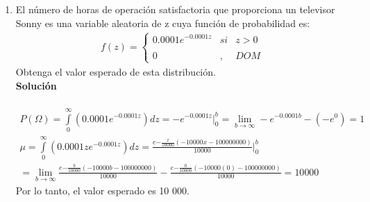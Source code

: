 \begin{enumerate}
    \item El número de horas de operación satisfactoria que proporciona un televisor Sonny es una variable aleatoria de z cuya función de probabilidad es: \\
    \begin{align*}
    f(z)= \left\{ \begin{array}{lcc}
    0.0001e^{-0.0001z} &   si  & z > 0 \\
    \\ 0 &  ,  & DOM
    \end{array}
    \right.
    \end{align*}
    Obtenga el valor esperado de esta distribución.
    \\\textbf{Solución}
    \\ \\
    \begin{gather*}
    P(\Omega) = \int \limits_{0}^{\infty} (0.0001e^{-0.0001z}) dz = -e^{-0.0001z} \bigg\vert_{0}^{b} = \lim \limits_{b \rightarrow \infty} -e^{-0.0001b} - (-e^{0}) = 1 \\
    \mu = \int \limits_{0}^{\infty} (0.0001ze^{-0.0001z}) dz = \frac{e{-\frac{x}{10 000}}(-10 000x - 100 000 000)}{10 000} \bigg\vert_{0}^b \\
    = \lim \limits_{b \rightarrow \infty} \frac{e{-\frac{b}{10 000}}(-10 000b - 100 000 000)}{10 000} - \frac{e{-\frac{0}{10 000}}(-10 000(0) - 100 000 000)}{10 000} = 10 000
    \end{gather*}
    Por lo tanto, el valor esperado es 10 000.
    
\end{enumerate}